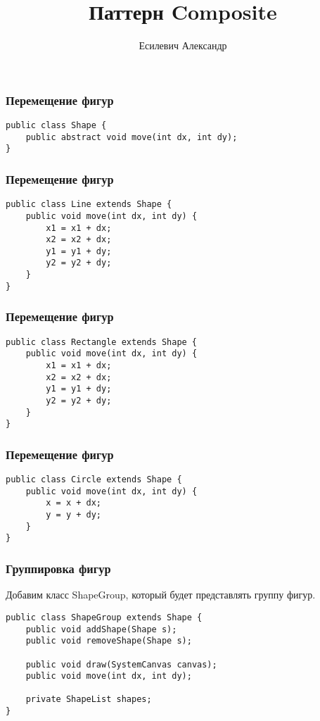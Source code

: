 \documentclass[handout]{beamer}
\title{Паттерн Composite}
\author{Есилевич Александр}
\begin{document}
\maketitle

\begin{frame}[fragile]
\frametitle{Перемещение фигур}
\begin{lstlisting}
public class Shape {
    public abstract void move(int dx, int dy);
}
\end{lstlisting}
\end{frame}


\begin{frame}[fragile]
\frametitle{Перемещение фигур}
\begin{lstlisting}
public class Line extends Shape {
    public void move(int dx, int dy) {
        x1 = x1 + dx;
        x2 = x2 + dx;
        y1 = y1 + dy;
        y2 = y2 + dy;
    }
}
\end{lstlisting}
\end{frame}


\begin{frame}[fragile]
\frametitle{Перемещение фигур}
\begin{lstlisting}
public class Rectangle extends Shape {
    public void move(int dx, int dy) {
        x1 = x1 + dx;
        x2 = x2 + dx;
        y1 = y1 + dy;
        y2 = y2 + dy;
    }
}
\end{lstlisting}
\end{frame}


\begin{frame}[fragile]
\frametitle{Перемещение фигур}
\begin{lstlisting}
public class Circle extends Shape {
    public void move(int dx, int dy) {
        x = x + dx;
        y = y + dy;
    }
}
\end{lstlisting}
\end{frame}


\begin{frame}[fragile]
\frametitle{Группировка фигур}
Добавим класс ShapeGroup, который будет представлять группу фигур.

\begin{lstlisting}
public class ShapeGroup extends Shape {
    public void addShape(Shape s);
    public void removeShape(Shape s);

    public void draw(SystemCanvas canvas);
    public void move(int dx, int dy);

    private ShapeList shapes;
}
\end{lstlisting}
\end{frame}
\end{document}
